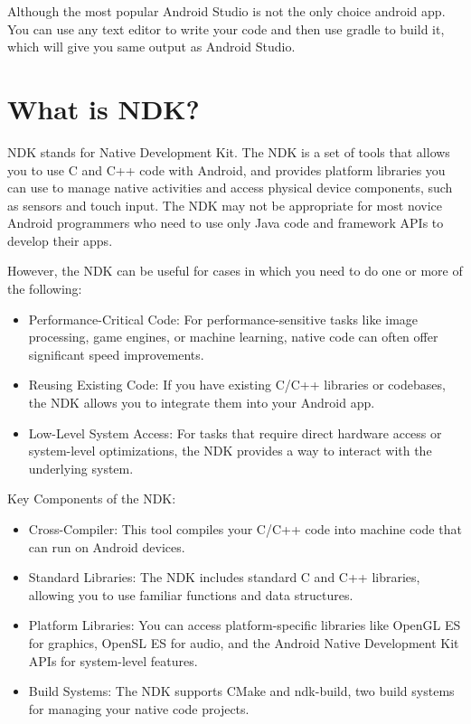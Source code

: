 \documentclass[12pt,oneside]{book}
\begin{document}
Although the most popular Android Studio is not the only choice android app. You can use any text editor to write your code and then use gradle to build it, which will give you same output as Android Studio.

    \section{What is NDK?}
NDK stands for Native Development Kit. The NDK is a set of tools that allows you to use C and C++ code with Android, and provides platform libraries you can use to manage native activities and access physical device components, such as sensors and touch input. The NDK may not be appropriate for most novice Android programmers who need to use only Java code and framework APIs to develop their apps.

However, the NDK can be useful for cases in which you need to do one or more of the following:
\begin{itemize}
    \item Performance-Critical Code: For performance-sensitive tasks like image processing, game engines, or machine learning, native code can often offer significant speed improvements.
    \item Reusing Existing Code: If you have existing C/C++ libraries or codebases, the NDK allows you to integrate them into your Android app.
    \item Low-Level System Access: For tasks that require direct hardware access or system-level optimizations, the NDK provides a way to interact with the underlying system.
\end{itemize}

Key Components of the NDK:
\begin{itemize}
    \item Cross-Compiler: This tool compiles your C/C++ code into machine code that can run on Android devices.
    \item Standard Libraries: The NDK includes standard C and C++ libraries, allowing you to use familiar functions and data structures.
    \item Platform Libraries: You can access platform-specific libraries like OpenGL ES for graphics, OpenSL ES for audio, and the Android Native Development Kit APIs for system-level features.
    \item Build Systems: The NDK supports CMake and ndk-build, two build systems for managing your native code projects.
\end{itemize}
\end{document}
